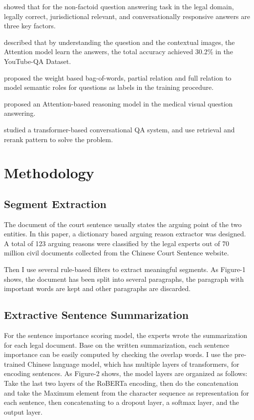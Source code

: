 \documentclass[11pt,a4paper]{article}
\begin{document}
\citet{mcelvain2019non} showed that for the non-factoid question answering task in the legal domain, legally correct, jurisdictional relevant, and conversationally responsive answers
are three key factors.

\citet{jin2019video} described that by understanding the question and the contextual images, the Attention model learn the answers, the total accuracy achieved 30.2\% in the YouTube-QA Dataset.

\citet{pizzato2008indexing} proposed the weight based bag-of-words, partial relation and full relation to model semantic roles for questions as labels in the training procedure.

\citet{zhan2020medical} proposed an Attention-based reasoning model in the medical visual question answering.

\citet{qu2020open} studied a transformer-based conversational QA system, and use retrieval and rerank pattern to solve the problem.

\section{Methodology}
\label{sec:hireachy}



\subsection{Segment Extraction}
The document of the court sentence usually states the arguing point of the two entities.
In this paper, a dictionary based arguing reason extractor was designed.
A total of 123 arguing reasons were classified by the legal experts out of 70 million
civil documents collected from the Chinese Court Sentence website.

Then I use several rule-based filters to extract meaningful segments.
As Figure-1 shows, the document has been split into several paragraphs,
the paragraph with important words are kept and other paragraphs are discarded.

\subsection{Extractive Sentence Summarization}

For the sentence importance scoring model, the experts wrote the summarization for each legal document.
Base on the written summarization, each sentence importance can be easily computed by checking the overlap words.
I use the pre-trained Chinese language model, which has multiple layers of transformers,
for encoding sentences.
As Figure-2 shows, the model layers are organized as follows:
Take the last two layers of the RoBERTa encoding, then do the concatenation and take the Maximum element from the character
sequence as representation for each sentence, then concatenating to a dropout layer, a softmax layer,
and the output layer.
\end{document}
